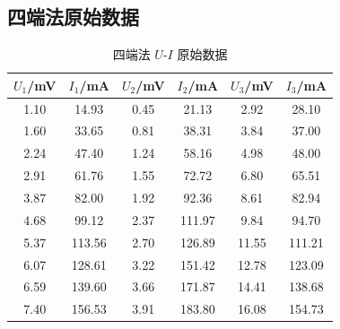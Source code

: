 \documentclass[UTF8,a4paper,12pt]{ctexart}
\begin{document}
\begin{table}[H]
\centering
\caption{惠斯登电桥法原始数据}
\label{tab:wheatstone_raw}
\end{table}

\begin{table}[H]
\centering
\caption{第二组交换法补充实验原始数据}
\label{tab:exchange_raw}
\end{table}

\subsection{四端法原始数据}
\begin{table}[H]
\centering
\caption{四端法 $U$-$I$ 原始数据}
\label{tab:four_raw}
\begin{tabular}{cccccc}
\toprule
$U_1$/mV & $I_1$/mA & $U_2$/mV & $I_2$/mA & $U_3$/mV & $I_3$/mA \\
\midrule
1.10 & 14.93 & 0.45 & 21.13 & 2.92 & 28.10 \\
1.60 & 33.65 & 0.81 & 38.31 & 3.84 & 37.00 \\
2.24 & 47.40 & 1.24 & 58.16 & 4.98 & 48.00 \\
2.91 & 61.76 & 1.55 & 72.72 & 6.80 & 65.51 \\
3.87 & 82.00 & 1.92 & 92.36 & 8.61 & 82.94 \\
4.68 & 99.12 & 2.37 & 111.97 & 9.84 & 94.70 \\
5.37 & 113.56 & 2.70 & 126.89 & 11.55 & 111.21 \\
6.07 & 128.61 & 3.22 & 151.42 & 12.78 & 123.09 \\
6.59 & 139.60 & 3.66 & 171.87 & 14.41 & 138.68 \\
7.40 & 156.53 & 3.91 & 183.80 & 16.08 & 154.73 \\
\bottomrule
\end{tabular}
\end{table}
\end{document}
